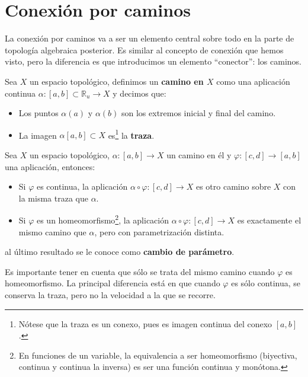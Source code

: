 \chapter{Conexión por caminos}%
\label{cha:conexion_por_caminos}
La conexión por caminos va a ser un elemento central sobre todo en la parte de topología algebraica posterior. Es similar al concepto de conexión que hemos visto, pero la diferencia es que introducimos un elemento ``conector'': los caminos.

\begin{defi}[Camino]
Sea $X$ un espacio topológico, definimos un \textbf{camino en $X$} como una aplicación continua $\alpha: \left[ a, b \right] \subset \mathbb{R}_u \rightarrow X$ y decimos que:
\begin{itemize}
    \item Los puntos $\alpha\left( a \right)$ y $\alpha\left( b \right)$ son los extremos inicial y final del camino.
    \item La imagen $\alpha\left[ a, b \right] \subset X$ es\footnote{Nótese que la traza es un conexo, pues es imagen continua del conexo $[a,b]$.} la \textbf{traza}.
\end{itemize}
\end{defi}

\begin{prop}
Sea $X$ un espacio topológico, $\alpha :[a,b] \rightarrow X$ un camino en él y $\varphi
 : [c,d]\rightarrow [a,b]$ una aplicación, entonces:
\begin{itemize}
\item Si $\varphi$ es continua, la aplicación $\alpha \circ \varphi :[c,d]\rightarrow X$ es otro camino sobre $X$ con la misma traza que $\alpha$.
\item Si $\varphi$ es un homeomorfismo\footnote{En funciones de un variable, la equivalencia a ser homeomorfismo (biyectiva, continua y continua la inversa) es ser una función continua y monótona.}, la aplicación $\alpha \circ \varphi:[c,d]\rightarrow X$ es exactamente el mismo camino que $\alpha$, pero con parametrización distinta.
\end{itemize}
al último resultado se le conoce como \textbf{cambio de parámetro}. 
\end{prop}

\begin{obs}
Es importante tener en cuenta que sólo se trata del mismo camino cuando $\varphi$ es homeomorfismo. La principal diferencia está en que cuando $\varphi$ es sólo continua, se conserva la traza, pero no la velocidad a la que se recorre.
\end{obs}

